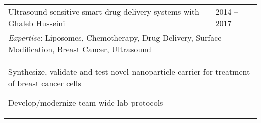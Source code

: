 \documentclass[letterpaper,11pt]{article}
\begin{document}
\begin{tabular}{@{}p{}l@{}}
  Ultrasound-sensitive smart drug delivery systems with Ghaleb Husseini & 2014 -- 2017 \\
  \multicolumn{2}{p{\textwidth}}{\textit{Expertise}: Liposomes, Chemotherapy, Drug Delivery, Surface Modification, Breast Cancer, Ultrasound} \\
  \multicolumn{2}{p{\textwidth}}{
    \begin{tabitemize} 
      \item Synthesize, validate and test novel nanoparticle carrier for treatment of breast cancer cells
      \item Develop/modernize team-wide lab protocols
    \end{tabitemize}}\\
\end{tabular} \\
\egroup
\setlength\extrarowheight{1pt}

\vspace{-0.8cm}

\begin{refsection}[articles]
  \nocite{*}
  \setlength\bibitemsep{0pt}
  \printbibliography[resetnumbers=true,type=article,title={Publications},heading=fix]
\end{refsection}

\vspace{-1.4\baselineskip}

\begin{refsection}[nopeer]
  \nocite{*}
  \setlength\bibitemsep{0pt}
  \printbibliography[resetnumbers=true,type=article,title={In Progress Publications},heading=fix]
\end{refsection}

\vspace{-1.4\baselineskip}
\end{document}

